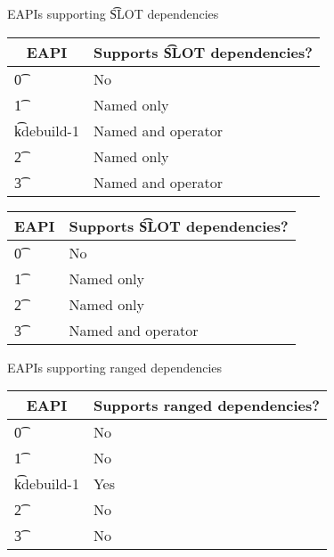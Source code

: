 \begin{centertable}{EAPIs supporting \t{SLOT} dependencies} \label{tab:slot-deps-table}
\IFKDEBUILDELSE
{
    \begin{tabular}{ l l }
        \toprule
            \multicolumn{1}{c}{\textbf{EAPI}} &
            \multicolumn{1}{c}{\textbf{Supports \t{SLOT} dependencies?}} \\
            \midrule
    \t{0} & No \\
    \t{1} & Named only \\
    \t{kdebuild-1} & Named and operator \\
    \t{2} & Named only \\
    \t{3} & Named and operator \\
    \bottomrule
    \end{tabular}
}{
    \begin{tabular}{ l l }
        \toprule
            \multicolumn{1}{c}{\textbf{EAPI}} &
            \multicolumn{1}{c}{\textbf{Supports \t{SLOT} dependencies?}} \\
            \midrule
    \t{0} & No \\
    \t{1} & Named only \\
    \t{2} & Named only \\
    \t{3} & Named and operator \\
    \bottomrule
    \end{tabular}
}
\end{centertable}

\IFKDEBUILDELSE
{
    \begin{centertable}{EAPIs supporting ranged dependencies} \label{tab:range-deps-table}
    \begin{tabular}{ l l }
        \toprule
        \multicolumn{1}{c}{\textbf{EAPI}} &
        \multicolumn{1}{c}{\textbf{Supports ranged dependencies?}} \\
        \midrule
    \t{0} & No \\
    \t{1} & No \\
    \t{kdebuild-1} & Yes \\
    \t{2} & No \\
    \t{3} & No \\
    \bottomrule
    \end{tabular}
    \end{centertable}
}{
}

